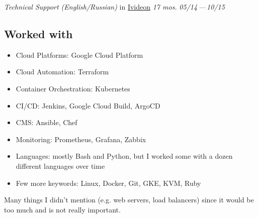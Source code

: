 \documentclass[11pt, a4paper]{article}
\newcommand{\Delimitline}{
  \vspace{-2ex}
  \noindent\makebox[\linewidth]{\rule{\DelimitlineLength}{0.12ex}} }
\newcommand{\forceindent}{\leavevmode{\parindent=1em\indent}}
\begin{document}
\begin{etaremune}[
  topsep=1ex,itemsep=1.5ex,partopsep=0ex,
  parsep=0ex,rightmargin=1em,leftmargin=2em
]
  \item
    \emph{Technical Support (English/Russian)}\hfill
    in \href{https://ivideon.com}{Ivideon}\hspace{1.0em}
    \textit{17 mos.}\hspace{1.0em}
    \textit{05/14\,—\,10/15}
\end{etaremune}

\vspace{0ex}


\subsection*{Worked with\vphantom{ (skills)}}
\Delimitline

\begin{itemize}
  \item Cloud Platforms: Google Cloud Platform
  \item Cloud Automation: Terraform
  \item Container Orchestration: Kubernetes
  \item CI/CD: Jenkins, Google Cloud Build, ArgoCD
  \item CMS: Ansible, Chef
  \item Monitoring: Prometheus, Grafana, Zabbix
  \item Languages: mostly Bash and Python, but I worked some with a dozen different languages over time
  \item Few more keywords: Linux, Docker, Git, GKE, KVM, Ruby
\end{itemize}

\forceindent Many things I didn't mention (e.g. web servers, load balancers) since it would be too much and is not really important.


\subsection*{\vphantom{Education: }}
\vphantom{ middle school}
\end{document}
